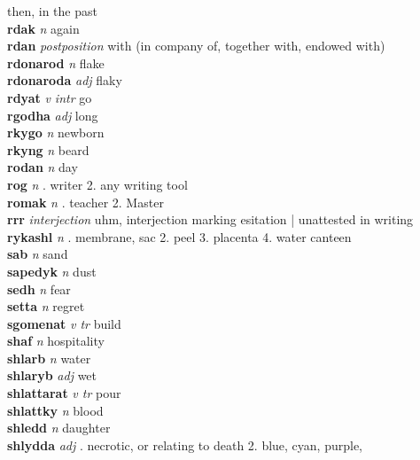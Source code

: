 \textperiodcentered then, in the past\\\textbf{rdak}   \emph{n} \textperiodcentered again\\\textbf{rdan}   \emph{postposition} \textperiodcentered with (in company of, together with, endowed with)\\\textbf{rdonarod}   \emph{n} \textperiodcentered flake\\\textbf{rdonaroda}   \emph{adj} \textperiodcentered flaky\\\textbf{rdyat}   \emph{v intr} \textperiodcentered go\\\textbf{rgodha}   \emph{adj} \textperiodcentered long\\\textbf{rkygo}   \emph{n} \textperiodcentered newborn\\\textbf{rkyng}   \emph{n} \textperiodcentered beard\\\textbf{rodan}   \emph{n} \textperiodcentered day\\\textbf{rog}   \emph{n} . writer 2. any writing tool \\\textbf{romak}   \emph{n} . teacher 2. Master \\\textbf{rrr}   \emph{interjection} \textperiodcentered uhm, interjection marking esitation | unattested in writing\\\textbf{rykashl}   \emph{n} . membrane, sac 2. peel 3. placenta 4. water canteen \\\textbf{sab}   \emph{n} \textperiodcentered sand\\\textbf{sapedyk}   \emph{n} \textperiodcentered dust\\\textbf{sedh}   \emph{n} \textperiodcentered fear\\\textbf{setta}   \emph{n} \textperiodcentered regret\\\textbf{sgomenat}   \emph{v tr} \textperiodcentered build\\\textbf{shaf}   \emph{n} \textperiodcentered hospitality\\\textbf{shlarb}   \emph{n} \textperiodcentered water\\\textbf{shlaryb}   \emph{adj} \textperiodcentered wet\\\textbf{shlattarat}   \emph{v tr} \textperiodcentered pour\\\textbf{shlattky}   \emph{n} \textperiodcentered blood\\\textbf{shledd}   \emph{n} \textperiodcentered daughter\\\textbf{shlydda}   \emph{adj} . necrotic, or relating to death 2. blue, cyan, purple, 
